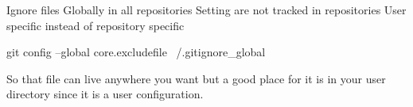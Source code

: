 Ignore files Globally in all repositories 
Setting are not tracked in repositories
User specific instead of repository specific 

git config --global core.excludefile ~/.gitignore_global

So that file can live anywhere you want but a good place for it is in your user directory since it is a user configuration.